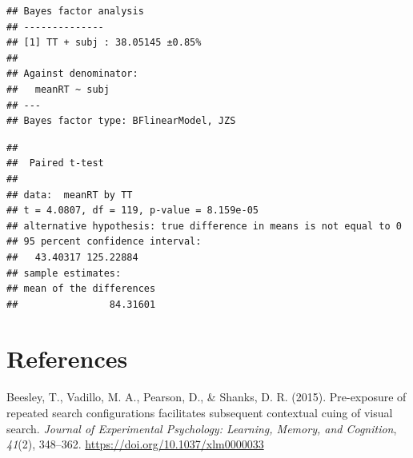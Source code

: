 \documentclass[
  man]{apa6}
\newlength{\cslhangindent}
\newlength{\cslentryspacingunit} %
\newenvironment{CSLReferences}[2] %
 {%
  \setlength{\parindent}{0pt}
  \ifodd #1
  \let\oldpar\par
  \def\par{\hangindent=\cslhangindent\oldpar}
  \fi
  \setlength{\parskip}{#2\cslentryspacingunit}
 }%
 {}
\begin{document}
\begin{verbatim}
## Bayes factor analysis
## --------------
## [1] TT + subj : 38.05145 ±0.85%
## 
## Against denominator:
##   meanRT ~ subj 
## ---
## Bayes factor type: BFlinearModel, JZS
\end{verbatim}

\begin{verbatim}
## 
##  Paired t-test
## 
## data:  meanRT by TT
## t = 4.0807, df = 119, p-value = 8.159e-05
## alternative hypothesis: true difference in means is not equal to 0
## 95 percent confidence interval:
##   43.40317 125.22884
## sample estimates:
## mean of the differences 
##                84.31601
\end{verbatim}

\newpage

\hypertarget{references}{%
\section*{References}\label{references}}

\hypertarget{refs}{}
\begin{CSLReferences}{1}{0}
\leavevmode{}%
Beesley, T., Vadillo, M. A., Pearson, D., \& Shanks, D. R. (2015). Pre-exposure of repeated search configurations facilitates subsequent contextual cuing of visual search. \emph{Journal of Experimental Psychology: Learning, Memory, and Cognition}, \emph{41}(2), 348--362. \url{https://doi.org/10.1037/xlm0000033}

\end{CSLReferences}
\end{document}

